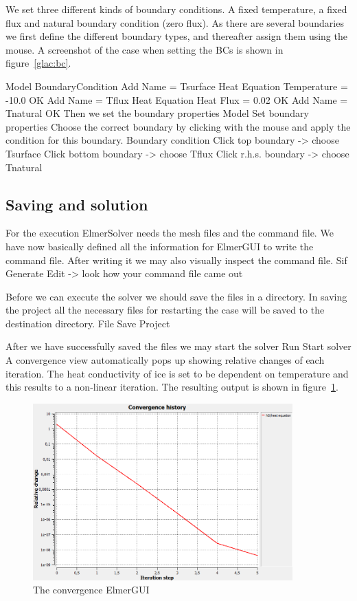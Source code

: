 We set three different kinds of boundary conditions. A fixed temperature, a fixed 
flux and natural boundary condition (zero flux). As there are several boundaries
we first define the different boundary types, and thereafter assign them using the mouse.
A screenshot of the case when setting the BCs is shown in figure~\ref{glac:bc}.

\ttbegin
Model
  BoundaryCondition
    Add 
      Name = Tsurface
      Heat Equation
        Temperature = -10.0
      OK
    Add 
      Name = Tflux
      Heat Equation
        Heat Flux = 0.02
      OK
    Add 
      Name = Tnatural
      OK
\ttend   
Then we set the boundary properties 
\ttbegin
Model 
  Set boundary properties  
\ttend
Choose the correct boundary by clicking with the mouse and apply the condition for this boundary.
\ttbegin
Boundary condition
  Click top boundary -> choose Tsurface
  Click bottom boundary -> choose Tflux
  Click r.h.s. boundary -> choose Tnatural
\ttend

\subsection*{Saving and solution}

For the execution ElmerSolver needs the mesh files and the command file. We have 
now basically defined all the information for ElmerGUI to write the command file. 
After writing it we may also visually inspect the command file.
\ttbegin
Sif 
  Generate
  Edit -> look how your command file came out  
\ttend

Before we can execute the solver we should save the files in a directory. In saving the project all the
necessary files for restarting the case will be saved to the destination directory.
\ttbegin
File 
  Save Project
\ttend

After we have successfully saved the files we may start the solver
\ttbegin
Run
  Start solver
\ttend
A convergence view automatically pops up showing relative changes of each iteration.
The heat conductivity of ice is set to be dependent on temperature and this results to a 
non-linear iteration.
The resulting output is shown in figure~\ref{glac:conv}.

\begin{figure}
\begin{center}
\includegraphics[width=100mm]{glacier_toy_convergence}
\caption{The convergence  ElmerGUI}\label{glac:conv}
\end{center}
\end{figure}

